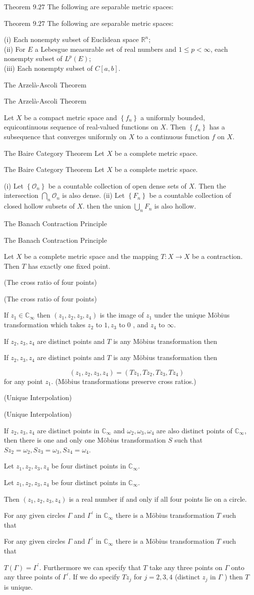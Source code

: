 \documentclass[17pt]{extarticle}
\newcommand{\boxset}[2]{\begin{mdframed}[style=darkQuesion]
#1
\end{mdframed}
\newpage
\begin{mdframed}[style=darkQuesion]
  #1
    \end{mdframed}
\begin{mdframed}[style=darkAnswer]
  #2
    \end{mdframed}
    \newpage
}
\begin{document}
\boxset{Theorem $9.27$ The following are separable metric spaces:}
{
(i) Each nonempty subset of Euclidean space $\mathbb{R}^{n}$;\[\ \]
(ii) For $E$ a Lebesgue measurable set of real numbers and $1 \leq p<\infty$, each nonempty subset of $L^{p}(E)$;\[\ \]
(iii) Each nonempty subset of $C[a, b]$.\[\ \]
}
\boxset{The Arzelà-Ascoli Theorem}
{Let $X$ be a compact metric space and $\left\{f_{n}\right\}$ a uniformly bounded, equicontinuous sequence of real-valued functions on $X$. Then $\left\{f_{n}\right\}$ has a subsequence that converges uniformly on $X$ to a continuous function $f$ on $X$.}
\boxset{The Baire Category Theorem Let $X$ be a complete metric space.}
{
(i) Let $\left\{\mathcal{O}_{n}\right\}$ be a countable collection of open dense sets of $X$. Then the intersection $\bigcap_{n} \mathcal{O}_{n}$ is also dense.
(ii) Let $\left\{F_{n}\right\}$ be a countable collection of closed hollow subsets of $X$. then the union $\bigcup_{n} F_{n}$ is also hollow.\[\ \]
}
\boxset{The Banach Contraction Principle}
{Let $X$ be a complete metric space and the mapping $T: X \rightarrow X$ be a contraction. Then $T$ has exactly one fixed point.}
\boxset{(The cross ratio of four points)}
{If $z_{1} \in \mathbb{C}_{\infty}$ then $\left(z_{1}, z_{2}, z_{3}, z_{4}\right)$ is the image of $z_{1}$ under the unique Möbius transformation which takes $z_{2}$ to $1, z_{3}$ to 0 , and $z_{4}$ to $\infty$.}

\boxset{If $z_{2}, z_{3}, z_{4}$ are distinct points and $T$ is any Möbius transformation then}
{
$$
\left(z_{1}, z_{2}, z_{3}, z_{4}\right)=\left(T z_{1}, T z_{2}, T z_{3}, T z_{4}\right)
$$
for any point $z_{1}$. (Möbius transformations preserve cross ratios.)
}
\boxset{(Unique Interpolation)}
{If $z_{2}, z_{3}, z_{4}$ are distinct points in $\mathbb{C}_{\infty}$ and $\omega_{2}, \omega_{3}, \omega_{4}$ are also distinct points of $\mathbb{C}_{\infty}$, then there is one and only one Möbius transformation $S$ such that $S z_{2}=\omega_{2}, S z_{3}=\omega_{3}, S z_{4}=\omega_{4}$.}

\boxset{Let $z_{1}, z_{2}, z_{3}, z_{4}$ be four distinct points in $\mathbb{C}_{\infty}$.}
{Then $\left(z_{1}, z_{2}, z_{3}, z_{4}\right)$ is a real number if and only if all four points lie on a circle.}


\boxset{For any given circles $\Gamma$ and $\Gamma^{\prime}$ in $\mathbb{C}_{\infty}$ there is a Möbius transformation $T$ such that}
{$T(\Gamma)=\Gamma^{\prime}$. Furthermore we can specify that $T$ take any three points on $\Gamma$ onto any three points of $\Gamma^{\prime}$. If we do specify $T z_{j}$ for $j=2,3,4$ (distinct $z_{j}$ in $\Gamma$ ) then $T$ is unique.}
\end{document}
